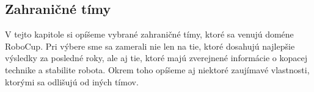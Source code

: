 \subsection{Zahraničné tímy}

V tejto kapitole si opíšeme vybrané zahraničné tímy, ktoré sa venujú doméne RoboCup. Pri výbere sme sa zamerali nie len na tie, ktoré dosahujú najlepšie výsledky za posledné roky, ale aj tie, ktoré majú zverejnené informácie o kopacej technike a stabilite robota. Okrem toho opíšeme aj niektoré zaujímavé vlastnosti, ktorými sa odlišujú od iných tímov.


%
%


%
%


%
%


%
%
